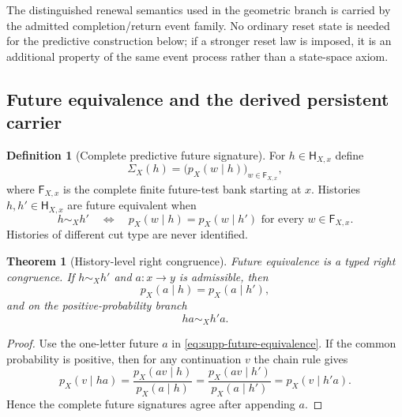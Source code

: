 \documentclass[11pt]{article}
\newtheorem{theorem}{Theorem}[section]
\theoremstyle{definition}
\newtheorem{definition}[definition]{Definition}
\theoremstyle{remark}
\begin{document}
The distinguished renewal semantics used in the geometric branch is carried by
the admitted completion/return event family.  No ordinary reset state is
needed for the predictive construction below; if a stronger reset law is
imposed, it is an additional property of the same event process rather than a
state-space axiom.

\subsection{Future equivalence and the derived persistent carrier}

\begin{definition}[Complete predictive future signature]
\label{def:supp-future-signature}
For $h\in\mathsf H_{X,x}$ define
\begin{equation}
 \Sigma_X(h)=\bigl(p_X(w\mid h)\bigr)_{w\in\mathsf F_{X,x}},
 \label{eq:supp-future-signature}
\end{equation}
where $\mathsf F_{X,x}$ is the complete finite future-test bank starting at
$x$.  Histories $h,h'\in\mathsf H_{X,x}$ are future equivalent when
\begin{equation}
 \boxed{h\sim_Xh'
 \quad\Longleftrightarrow\quad
 p_X(w\mid h)=p_X(w\mid h')
 \text{ for every }w\in\mathsf F_{X,x}.}
 \label{eq:supp-future-equivalence}
\end{equation}
Histories of different cut type are never identified.
\end{definition}

\begin{theorem}[History-level right congruence]
\label{thm:supp-right-congruence}
Future equivalence is a typed right congruence.  If $h\sim_Xh'$ and
$a:x\to y$ is admissible, then
\begin{equation}
 p_X(a\mid h)=p_X(a\mid h'),
 \label{eq:supp-one-letter-equality}
\end{equation}
and on the positive-probability branch
\begin{equation}
 \boxed{ha\sim_Xh'a.}
 \label{eq:supp-right-congruence}
\end{equation}
\end{theorem}

\begin{proof}
Use the one-letter future $a$ in
\eqref{eq:supp-future-equivalence}.  If the common probability is positive,
then for any continuation $v$ the chain rule gives
\[
 p_X(v\mid ha)
 =\frac{p_X(av\mid h)}{p_X(a\mid h)}
 =\frac{p_X(av\mid h')}{p_X(a\mid h')}
 =p_X(v\mid h'a).
\]
Hence the complete future signatures agree after appending $a$.
\end{proof}
\end{document}
